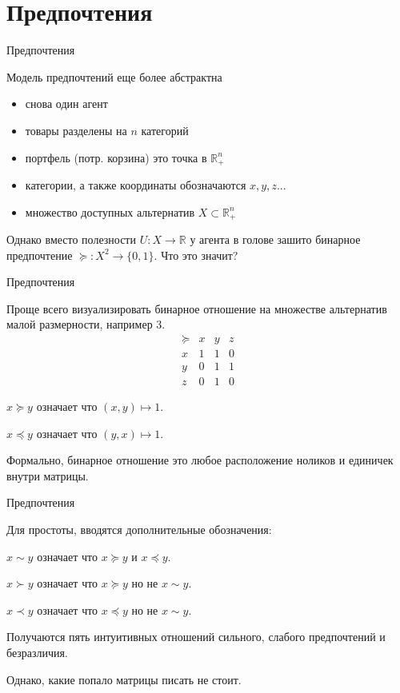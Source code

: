 \documentclass{beamer}
\begin{document}
\section{Предпочтения}

\begin{frame}{Предпочтения}

Модель предпочтений еще более абстрактна

\begin{itemize}
\item снова один агент
\item товары разделены на $n$ категорий
\item портфель (потр. корзина) это точка в $\mathbb{R}_{+}^{n}$	
\item категории, а также координаты обозначаются $x, y, z...$
\item множество доступных альтернатив $X \subset \mathbb{R}_{+}^{n}$
\end{itemize}

Однако вместо полезности $U: X \to \mathbb{R}$ у агента в голове зашито бинарное предпочтение $\succcurlyeq: X^2 \to \{0,1\}.$ Что это значит?

\end{frame}

\begin{frame}{Предпочтения}

Проще всего визуализировать бинарное отношение на множестве альтернатив малой размерности, например 3.
$$
\begin{array}{c|ccc}
 \succcurlyeq & x & y & z\\
\hline
x & 1 & 1 & 0 \\
y & 0 & 1 & 1\\
z & 0 & 1 & 0
\end{array}
$$

$x \succcurlyeq y$ означает что $(x,y) \mapsto 1$.

$x \preccurlyeq y$ означает что $(y,x) \mapsto 1$.

Формально, бинарное отношение это любое расположение ноликов и единичек внутри матрицы.

\end{frame}

\begin{frame}{Предпочтения}

Для простоты, вводятся дополнительные обозначения:

$x \sim y$ означает что $x \succcurlyeq y$ и $x \preccurlyeq y$.

$x \succ y$ означает что $x \succcurlyeq y$ но не $x \sim y$.

$x \prec y$ означает что $x \preccurlyeq y$ но не $x \sim y$.

Получаются пять интуитивных отношений сильного, слабого предпочтений и безразличия.

Однако, какие попало матрицы писать не стоит.

\end{frame}
\end{document}
